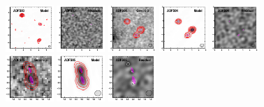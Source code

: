 \documentclass[iop]{emulateapj}
\begin{document}
\begin{figure}[!tbp]
\begin{centering}
\includegraphics[width=0.162\textwidth]{../Figures/modelfit/ADFS03_model_bestfit.pdf}
\includegraphics[width=0.162\textwidth]{../Figures/modelfit/ADFS03_residual_bestfit.pdf}
\includegraphics[width=0.162\textwidth]{../Figures/modelfit/ADFS04_optical_bestfit.pdf}
\includegraphics[width=0.162\textwidth]{../Figures/modelfit/ADFS04_model_bestfit.pdf}
\includegraphics[width=0.162\textwidth]{../Figures/modelfit/ADFS04_residual_bestfit.pdf}
\includegraphics[width=0.162\textwidth]{../Figures/modelfit/ADFS05_optical_bestfit.pdf}
\includegraphics[width=0.162\textwidth]{../Figures/modelfit/ADFS05_model_bestfit.pdf}
\includegraphics[width=0.162\textwidth]{../Figures/modelfit/ADFS05_residual_bestfit.pdf}

\end{centering}
\end{figure}
\end{document}
